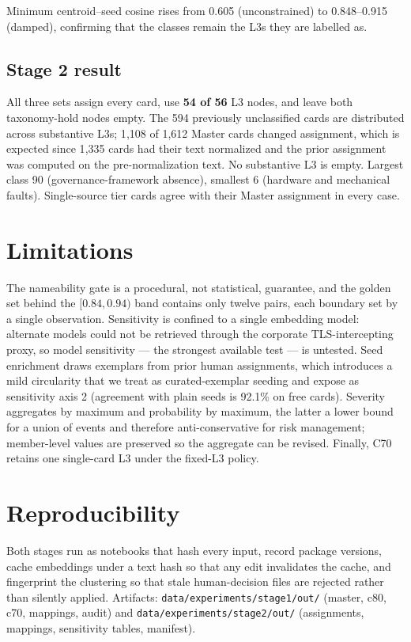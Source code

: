\documentclass[11pt,a4paper]{article}
\begin{document}
Minimum centroid--seed cosine rises from 0.605 (unconstrained) to 0.848--0.915 (damped), confirming that the classes remain the L3s they are labelled as.

\subsection{Stage 2 result}

All three sets assign every card, use \textbf{54 of 56} L3 nodes, and leave both taxonomy-hold nodes empty. The 594 previously unclassified cards are distributed across substantive L3s; 1{,}108 of 1{,}612 Master cards changed assignment, which is expected since 1{,}335 cards had their text normalized and the prior assignment was computed on the pre-normalization text. No substantive L3 is empty. Largest class 90 (governance-framework absence), smallest 6 (hardware and mechanical faults). Single-source tier cards agree with their Master assignment in every case.

\section{Limitations}

The nameability gate is a procedural, not statistical, guarantee, and the golden set behind the $[0.84,0.94)$ band contains only twelve pairs, each boundary set by a single observation. Sensitivity is confined to a single embedding model: alternate models could not be retrieved through the corporate TLS-intercepting proxy, so model sensitivity --- the strongest available test --- is untested. Seed enrichment draws exemplars from prior human assignments, which introduces a mild circularity that we treat as curated-exemplar seeding and expose as sensitivity axis 2 (agreement with plain seeds is 92.1\% on free cards). Severity aggregates by maximum and probability by maximum, the latter a lower bound for a union of events and therefore anti-conservative for risk management; member-level values are preserved so the aggregate can be revised. Finally, C70 retains one single-card L3 under the fixed-L3 policy.

\section{Reproducibility}

Both stages run as notebooks that hash every input, record package versions, cache embeddings under a text hash so that any edit invalidates the cache, and fingerprint the clustering so that stale human-decision files are rejected rather than silently applied. Artifacts: \texttt{data/experiments/stage1/out/} (master, c80, c70, mappings, audit) and \texttt{data/experiments/stage2/out/} (assignments, mappings, sensitivity tables, manifest).
\end{document}
